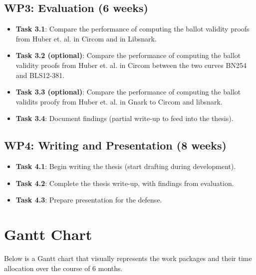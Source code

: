 \documentclass{article}
\begin{document}
\subsection*{WP3: Evaluation (6 weeks)}
\begin{itemize}
    \item \textbf{Task 3.1}: Compare the performance of computing the ballot validity proofs from Huber et. al. in Circom and in Libsnark.
    \item \textbf{Task 3.2 (optional)}: Compare the performance of computing the ballot validity proofs from Huber et. al. in Circom between the two curves BN254 and BLS12-381.
    \item \textbf{Task 3.3 (optional)}: Compare the performance of computing the ballot validits proofy from Huber et. al. in Gnark to Circom and libsnark.
    \item \textbf{Task 3.4}: Document findings (partial write-up to feed into the thesis).
\end{itemize}

\subsection*{WP4: Writing and Presentation (8 weeks)}
\begin{itemize}
    \item \textbf{Task 4.1}: Begin writing the thesis (start drafting during development).
    \item \textbf{Task 4.2}: Complete the thesis write-up, with findings from evaluation.
    \item \textbf{Task 4.3}: Prepare presentation for the defense.
\end{itemize}

\section{Gantt Chart}\label{gantt}

Below is a Gantt chart that visually represents the work packages and their time allocation over the course of 6 months.\\
\end{document}
